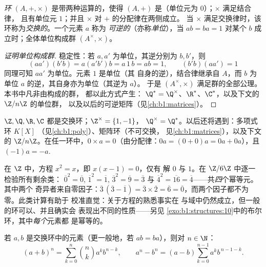 \begin{definition}[环]\label{def:b1:structures:ring}
\emph{环} $(A, +, \times)$ 是带两种运算的，使得
$(A, +)$ 是（单位元为 $0$）；$\times$ 满足结合律，
且有单位元 $1$；并且 $\times$ 对 $+$ 的分配律在两侧成立。
当 $\times$ 满足交换律时，该环称为\emph{交换的}。一个元素 $a$ 称为
\emph{可逆的}（亦称\emph{单位}），当 $ab = ba = 1$
对某个 $b$ 成立时；全体单位构成群 $(A^\times, \times)$。
\end{definition}

\begin{proof}[证明单位构成群]
稳定性：若 $a, a'$ 为单位，其逆分别为 $b, b'$，则
\[
(aa')(b'b) = a(a'b')b = a\,1\,b = ab = 1,
\qquad (b'b)(aa') = 1
\]
同理可知 $aa'$ 为单位。元素 $1$ 是单位（其
自身的逆），结合律继承自 $A$，而
$b$ 为单位 $a$ 的逆，其自身亦为单位（其逆为 $a$）。
于是 $(A^\times, \times)$ 满足群的全部公理。本书中凡非由构成的群，
都以此方式产生：
$\Q^* = \Q^\times$、$\R^*$、$\C^*$，以及下文的 $\Z/n\Z$ 的单位群，
以及以后的可逆矩阵（见\cref{ch:b1:matrices}）。
\end{proof}

\begin{example}\label{ex:b1:structures:rings}
$\Z, \Q, \R, \C$ 都是交换环；$\Z^\times = \{1, -1\}$，
$\Q^\times = \Q^*$。以后还将遇到：多项式环 $K[X]$
（见\cref{ch:b1:poly}）、矩阵环（不可交换，
见\cref{ch:b1:matrices}），以及下文的 $\Z/n\Z$。在任一环中，$0 \times
a = 0$（由分配律：$0a = (0+0)a = 0a + 0a$），且
$(-1)a = -a$.
\end{example}

\begin{example}\label{ex:b1:structures:idempotents}
在 $\Z$ 中，方程 $x^2 = x$，即 $x(x - 1) = 0$，仅有
解 $0$ 与 $1$。在 $\Z/6\Z$ 中逐一检验所有剩余类：
$\overline0^2 = \overline0$, $\overline1^2 = \overline1$,
$\overline3^2 = \overline9 = \overline3$ 与 $\overline4^2 =
\overline{16} = \overline4$——共\emph{四}个幂等元。其中两个
奇异者来自零因子：$\overline3\,(\overline3 -
\overline1) = \overline3 \times \overline2 = \overline6 =
\overline0$，而两个因子都不为零。此类计算有助于
校准直觉：关于方程的熟悉事实在
与域中仍然成立，但一般的环可以、并且确实会
表现出不同的性质——另见
\cref{exo:b1:structures:10}中的布尔环，其中\emph{每个}元素都
是幂等的。
\end{example}

\begin{proposition}[交换环中的二项式定理]\label{prop:b1:structures:binomial}
若 $a, b$ 是交换环中的元素（更一般地，若
$ab = ba$），则对 $n \in \N$：
\[
(a+b)^n = \sum_{k=0}^n \binom nk a^k b^{n-k},
\qquad
a^n - b^n = (a - b) \sum_{k=0}^{n-1} a^k b^{\,n-1-k} .
\]
\end{proposition}

